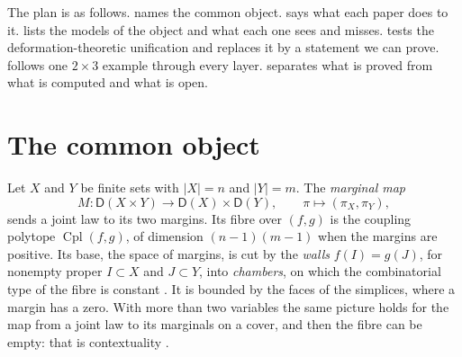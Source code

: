 \documentclass[11pt]{article}
\theoremstyle{definition}
\theoremstyle{remark}
\newcommand{\D}{\mathsf{D}}
\newcommand{\Cpl}{\operatorname{Cpl}}
\begin{document}
The plan is as follows.  names the common object.  says what each paper does to it. 
lists the models of the object and what each one sees and misses.  tests the deformation-theoretic unification and
replaces it by a statement we can prove.  follows one $2\times3$ example through every layer.  separates
what is proved from what is computed and what is open.

\section{The common object}\label{sec:object}

Let $X$ and $Y$ be finite sets with $\lvert X\rvert=n$ and $\lvert Y\rvert=m$. The \emph{marginal map}
\[
M\colon\D(X\times Y)\longrightarrow\D(X)\times\D(Y),\qquad \pi\longmapsto(\pi_X,\pi_Y),
\]
sends a joint law to its two margins. Its fibre over $(f,g)$ is the coupling polytope $\Cpl(f,g)$, of dimension $(n-1)(m-1)$ when the margins
are positive. Its base, the space of margins, is cut by the \emph{walls} $f(I)=g(J)$, for nonempty proper $I\subset X$ and $J\subset Y$, into
\emph{chambers}, on which the combinatorial type of the fibre is constant \cite[Prop.~6.6]{Conditionals}. It is bounded by the faces of the
simplices, where a margin has a zero. With more than two variables the same picture holds for the map from a joint law to its marginals on a
cover, and then the fibre can be empty: that is contextuality \cite{AbramskyBrandenburger2011}.
\end{document}
